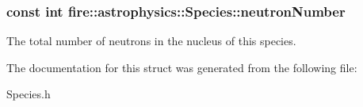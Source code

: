 \subsubsection[{\texorpdfstring{neutron\+Number}{neutronNumber}}]{\setlength{\rightskip}{0pt plus 5cm}const int fire\+::astrophysics\+::\+Species\+::neutron\+Number}\hypertarget{a00028_acd295953eb640a1354df0be96e63f1cd}{}\label{a00028_acd295953eb640a1354df0be96e63f1cd}
The total number of neutrons in the nucleus of this species. 

The documentation for this struct was generated from the following file\+:\begin{DoxyCompactItemize}
\item 
Species.\+h\end{DoxyCompactItemize}
